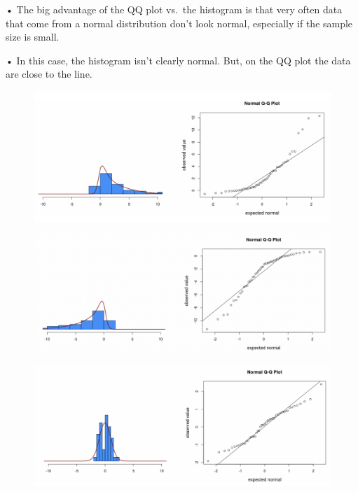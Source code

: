 \documentclass[
  letterpaper,
  DIV=11,
  numbers=noendperiod]{scrreprt}
\begin{document}
• The big advantage of the QQ plot vs.~the histogram is that very often
data that come from a normal distribution don't look normal, especially
if the sample size is small.

• In this case, the histogram isn't clearly normal. But, on the QQ plot
the data are close to the line.

\begin{figure}

{\centering \includegraphics{images/mod4_pt1_12.png}

}

\end{figure}

\begin{figure}

{\centering \includegraphics{images/mod4_pt1_13.png}

}

\end{figure}

\begin{figure}

{\centering \includegraphics{images/mod4_pt1_14.png}

}

\end{figure}
\end{document}
